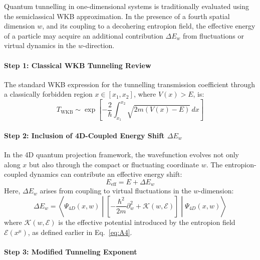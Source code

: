\documentclass[12pt]{article}
\begin{document}
Quantum tunnelling in one-dimensional systems is traditionally evaluated using the semiclassical WKB approximation. In the presence of a fourth spatial dimension \(w\), and its coupling to a decohering entropion field, the effective energy of a particle may acquire an additional contribution \(\Delta E_w\) from fluctuations or virtual dynamics in the \(w\)-direction.

\paragraph{Step 1: Classical WKB Tunneling Review}

The standard WKB expression for the tunnelling transmission coefficient through a classically forbidden region \(x \in [x_1, x_2]\), where \(V(x) > E\), is:
\begin{equation}
T_{\text{WKB}} \sim \exp\left[ -\frac{2}{\hbar} \int_{x_1}^{x_2} \sqrt{2m \left( V(x) - E \right)}\, dx \right]
\label{eq:A10_WKBclassical}
\end{equation}

\paragraph{Step 2: Inclusion of 4D-Coupled Energy Shift \(\Delta E_w\)}

In the 4D quantum projection framework, the wavefunction evolves not only along \(x\) but also through the compact or fluctuating coordinate \(w\). The entropion-coupled dynamics can contribute an effective energy shift:
\begin{equation}
E_{\text{eff}} = E + \Delta E_w
\label{eq:A10_Eeff}
\end{equation}
Here, \(\Delta E_w\) arises from coupling to virtual fluctuations in the \(w\)-dimension:
\begin{equation}
\Delta E_w = \left\langle \Psi_{4D}(x, w) \middle| \left[ -\frac{\hbar^2}{2m}\partial_w^2 + \mathcal{K}(w, \mathcal{E}) \right] \middle| \Psi_{4D}(x, w) \right\rangle
\label{eq:A10_DeltaEw}
\end{equation}
where \(\mathcal{K}(w, \mathcal{E})\) is the effective potential introduced by the entropion field \(\mathcal{E}(x^\mu)\), as defined earlier in Eq.~\eqref{eq:A4}.

\paragraph{Step 3: Modified Tunneling Exponent}
\end{document}
